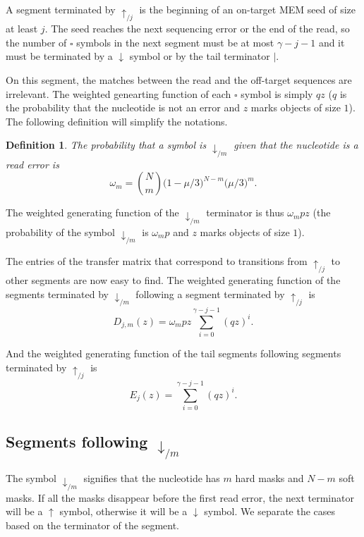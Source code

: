 \documentclass{article}
\newtheorem{definition}{Definition}
\begin{document}
A segment terminated by $\uparrow_{/j}$ is the beginning of an on-target
MEM seed of size at least $j$. The seed reaches the next sequencing
error or the end of the read, so the number of $\square$ symbols in the
next segment must be at most $\gamma-j-1$ and it must be terminated by a
$\downarrow$ symbol or by the tail terminator $|$.

On this segment, the matches between the read and the off-target sequences
are irrelevant. The weighted genearting function of each $\square$ symbol
is simply $qz$ ($q$ is the probability that the nucleotide is not an error
and $z$ marks objects of size $1$). The following definition will simplify
the notations.

\begin{definition}
The probability that a symbol is $\downarrow_{/m}$ given that the
nucleotide is a read error is
\begin{equation}
\label{eq:omega}
\omega_m = {N \choose m} \big(1 - \mu/3\big)^{N-m} \big(\mu/3\big)^m.
\end{equation}
\end{definition}

The weighted generating function of the $\downarrow_{/m}$ terminator is
thus $\omega_m pz$ (the probability of the symbol $\downarrow_{/m}$ is
$\omega_m p$ and $z$ marks objects of size $1$).

The entries of the transfer matrix that correspond to transitions from
$\uparrow_{/j}$ to other segments are now easy to find. The weighted
generating function of the segments terminated by $\downarrow_{/m}$
following a segment terminated by $\uparrow_{/j}$ is
\begin{equation}
\label{eq:D}
D_{j,m}(z) = \omega_m pz \sum_{i=0}^{\gamma-j-1} (qz)^i.
\end{equation}

And the weighted generating function of the tail segments following
segments terminated by $\uparrow_{/j}$ is
\begin{equation}
\label{eq:E}
E_j(z) = \sum_{i=0}^{\gamma-j-1} (qz)^i.
\end{equation}


\subsection{Segments following $\downarrow_{/m}$}

The symbol $\downarrow_{/m}$ signifies that the nucleotide has $m$ hard
masks and $N-m$ soft masks. If all the masks disappear before the first
read error, the next terminator will be a $\uparrow$ symbol, otherwise it
will be a $\downarrow$ symbol. We separate the cases based on the
terminator of the segment.
\end{document}
